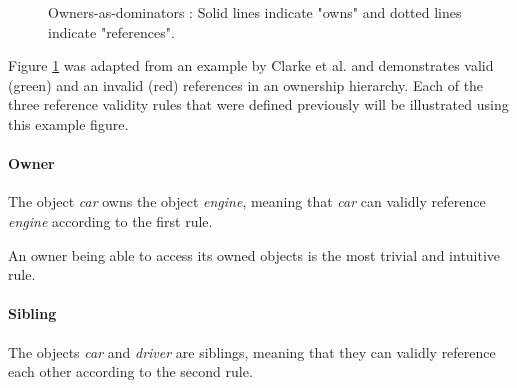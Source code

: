 \documentclass[sigplan,11pt,nonacm]{acmart}
\begin{document}
\begin{figure}

  \caption{Owners-as-dominators \cite{flexible-alias-protection}: Solid lines indicate "owns" and dotted lines indicate "references".}
  \label{fig:owners-as-dominators}
\end{figure}

Figure \ref{fig:owners-as-dominators} was adapted from an example by Clarke et al. \cite{flexible-alias-protection} and demonstrates valid (green) and an invalid (red) references in an ownership hierarchy.
Each of the three reference validity rules that were defined previously will be illustrated using this example figure.

\paragraph{Owner}

The object \emph{car} owns the object \emph{engine}, meaning that \emph{car} can validly reference \emph{engine} according to the first rule.

An owner being able to access its owned objects is the most trivial and intuitive rule.

\paragraph{Sibling}

The objects \emph{car} and \emph{driver} are siblings, meaning that they can validly reference each other according to the second rule.
\end{document}
